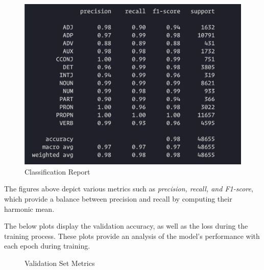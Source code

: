 \begin{figure}[h]
	\centering
	\includegraphics[scale=0.56]{img/class_report.png}
	\caption{Classification Report}
\end{figure}

The figures above depict various metrics such as \textit{precision, recall, and F1-score}, which provide a balance between precision and recall by computing their harmonic mean.


The below plots display the validation accuracy, as well as the loss during the training process. These plots provide an analysis of the model's performance with each epoch during training.

\begin{figure}[h]
    \caption{Validation Set Metrics}
\end{figure}



